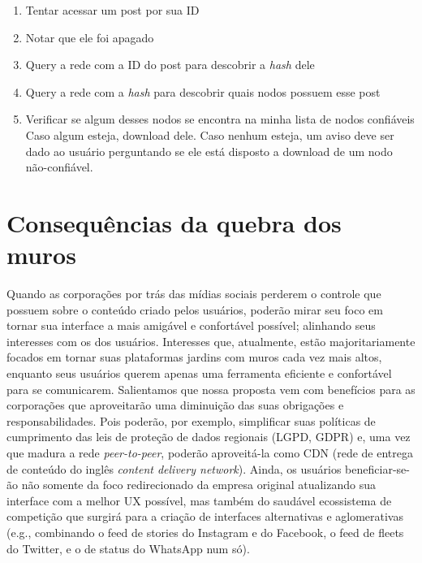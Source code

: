 \begin{enumerate}
    \item Tentar acessar um post por sua ID
    \item Notar que ele foi apagado
    \item Query a rede com a ID do post para descobrir a \textit{hash} dele
    \item Query a rede com a \textit{hash} para descobrir quais nodos possuem esse post
    \item Verificar se algum desses nodos se encontra na minha lista de nodos confiáveis
        \subitem Caso algum esteja, download dele.
        \subitem Caso nenhum esteja, um aviso deve ser dado ao usuário perguntando se ele está disposto a download de um nodo não-confiável.
\end{enumerate}

\section{Consequências da quebra dos muros}

Quando as corporações por trás das mídias sociais perderem o controle que possuem sobre o conteúdo criado pelos usuários, poderão mirar seu foco em tornar sua interface a mais amigável e confortável possível; alinhando seus interesses com os dos usuários.
Interesses que, atualmente, estão majoritariamente focados em tornar suas plataformas jardins com muros cada vez mais altos, enquanto seus usuários querem apenas uma ferramenta eficiente e confortável para se comunicarem.
Salientamos que nossa proposta vem com benefícios para as corporações que aproveitarão uma diminuição das suas obrigações e responsabilidades.
Pois poderão, por exemplo, simplificar suas políticas de cumprimento das leis de proteção de dados regionais (LGPD, GDPR) e, uma vez que madura a rede \textit{peer-to-peer}, poderão aproveitá-la como CDN (rede de entrega de conteúdo do inglês \textit{content delivery network}).
Ainda, os usuários beneficiar-se-ão não somente da foco redirecionado da empresa original atualizando sua interface com a melhor UX possível, mas também do saudável ecossistema de competição que surgirá para a criação de interfaces alternativas e aglomerativas (e.g., combinando o feed de stories do Instagram e do Facebook, o feed de fleets do Twitter, e o de status do WhatsApp num só).

